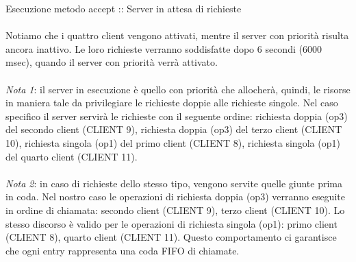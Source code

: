 \documentclass[10pt, a4paper]{article}
\begin{document}
Esecuzione metodo accept :: Server in attesa di richieste
\\\\
Notiamo che i quattro client vengono attivati, mentre il server con priorità risulta ancora inattivo. Le loro richieste verranno soddisfatte dopo 6 secondi (6000 msec), quando il server con priorità verrà attivato.
\\\\
\textit{Nota 1}: il server in esecuzione è quello con priorità che allocherà, quindi, le risorse in maniera tale da privilegiare le richieste doppie alle richieste singole. Nel caso specifico il server servirà le richieste con il seguente ordine: richiesta doppia (op3) del secondo client (CLIENT 9), richiesta doppia (op3) del terzo client (CLIENT 10), richiesta singola (op1) del primo client (CLIENT 8), richiesta singola (op1) del quarto client (CLIENT 11).
\\\\
\textit{Nota 2}: in caso di richieste dello stesso tipo, vengono servite quelle giunte prima in coda. Nel nostro caso le operazioni di richiesta doppia (op3) verranno eseguite in ordine di chiamata: secondo client (CLIENT 9), terzo client (CLIENT 10). Lo stesso discorso è valido per le operazioni di richiesta singola (op1): primo client (CLIENT 8), quarto client (CLIENT 11). Questo comportamento ci garantisce che ogni entry rappresenta una coda FIFO di chiamate.
\printindex
\end{document}
